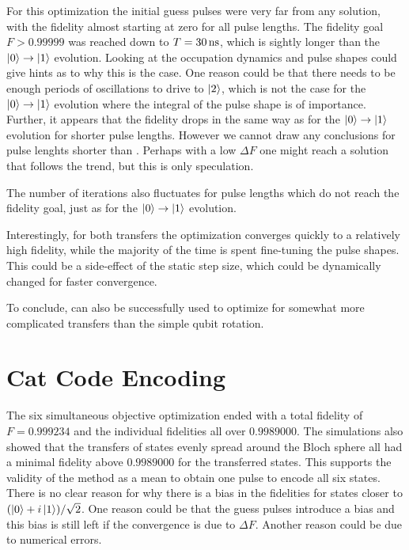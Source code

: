 \documentclass[main.tex]{subfiles}
\begin{document}
For this optimization the initial guess pulses were very far from any solution, with the fidelity almost starting at zero for all pulse lengths.
The fidelity goal \(F > 0.99999\) was reached down to \(T = \SI{30}{\nano\second}\), which is sightly longer than the \(\ket{0}\rightarrow\ket{1}\) evolution.
Looking at the occupation dynamics and pulse shapes could give hints as to why this is the case.
One reason could be that there needs to be enough periods of oscillations to drive to \(\ket{2}\), which is not the case for the \(\ket{0}\rightarrow\ket{1}\) evolution where the integral of the pulse shape is of importance.
Further, it appears that the fidelity drops in the same way as for the \(\ket{0}\rightarrow\ket{1}\) evolution for shorter pulse lengths.
However we cannot draw any conclusions for pulse lenghts shorter than .
Perhaps with a low \(\Delta F\) one might reach a solution that follows the trend, but this is only speculation.

The number of iterations also fluctuates for pulse lengths which do not reach the fidelity goal, just as for the \(\ket{0}\rightarrow\ket{1}\) evolution.

Interestingly, for both transfers the optimization converges quickly to a relatively high fidelity, while the majority of the time is spent fine-tuning the pulse shapes.
This could be a side-effect of the static step size, which could be dynamically changed for faster convergence.

To conclude, \krotov{} can also be successfully used to optimize for somewhat more complicated transfers than the simple qubit rotation.

\section{Cat Code Encoding}
The six simultaneous objective optimization ended with a total fidelity of \(F = 0.999234\) and the individual fidelities all over \(0.9989000\).
The simulations also showed that the transfers of states evenly spread around the Bloch sphere all had a minimal fidelity above \(0.9989000\) for the transferred states.
This supports the validity of the method as a mean to obtain one pulse to encode all six states.
There is no clear reason for why there is a bias in the fidelities for states closer to \((\ket{0}+i\ket{1})/\sqrt{2}\).
One reason could be that the guess pulses introduce a bias and this bias is still left if the convergence is due to \(\Delta F\).
Another reason could be due to numerical errors.
\end{document}
